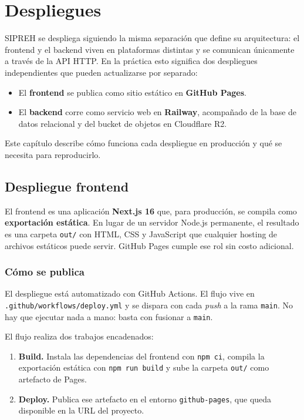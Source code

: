\chapter{Despliegues}
\label{ch:despliegues}

SIPREH se despliega siguiendo la misma separación que define su arquitectura: el frontend y el backend viven en plataformas distintas y se comunican únicamente a través de la API HTTP. En la práctica esto significa dos despliegues independientes que pueden actualizarse por separado:

\begin{itemize}
    \item El \textbf{frontend} se publica como sitio estático en \textbf{GitHub Pages}.
    \item El \textbf{backend} corre como servicio web en \textbf{Railway}, acompañado de la base de datos relacional y del bucket de objetos en Cloudflare R2.
\end{itemize}

Este capítulo describe cómo funciona cada despliegue en producción y qué se necesita para reproducirlo.

\section{Despliegue frontend}
\label{sec:deploy_frontend}

El frontend es una aplicación \textbf{Next.js 16} que, para producción, se compila como \textbf{exportación estática}. En lugar de un servidor Node.js permanente, el resultado es una carpeta \texttt{out/} con HTML, CSS y JavaScript que cualquier hosting de archivos estáticos puede servir. GitHub Pages cumple ese rol sin costo adicional.

\subsection{Cómo se publica}

El despliegue está automatizado con GitHub Actions. El flujo vive en \texttt{.github/workflows/deploy.yml} y se dispara con cada \textit{push} a la rama \texttt{main}. No hay que ejecutar nada a mano: basta con fusionar a \texttt{main}.

El flujo realiza dos trabajos encadenados:

\begin{enumerate}
    \item \textbf{Build.} Instala las dependencias del frontend con \texttt{npm ci}, compila la exportación estática con \texttt{npm run build} y sube la carpeta \texttt{out/} como artefacto de Pages.
    \item \textbf{Deploy.} Publica ese artefacto en el entorno \texttt{github-pages}, que queda disponible en la URL del proyecto.
\end{enumerate}

